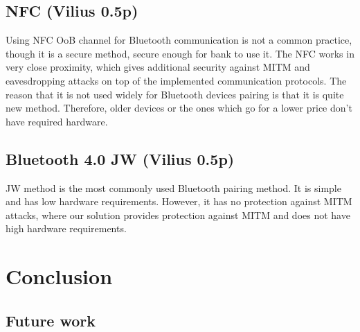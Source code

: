 \documentclass[12pt]{article}
\begin{document}
\subsection{NFC (Vilius 0.5p)}
\label{sub:Image scanning}

Using NFC OoB channel for Bluetooth communication is not a common practice, though it is a secure method, secure enough for bank to use it. The NFC works in very close proximity, which gives additional security against MITM and eavesdropping attacks on top of the implemented communication protocols. The reason that it is not used widely for Bluetooth devices pairing is that it is quite new method. Therefore, older devices or the ones which go for a lower price don’t have required hardware.

\newpage
\subsection{Bluetooth 4.0 JW (Vilius 0.5p)}
\label{sub:Bluetooth 4.0 JW}

JW method is the most commonly used Bluetooth pairing method. It is simple and has low hardware requirements. However, it has no protection against MITM attacks, where our solution provides protection against MITM and does not have high hardware requirements.

\section{Conclusion}
\label{sec:Conclusion}
\subsection{Future work}
\label{sub:future work}

\newpage


\nocite{*}

\end{document}
